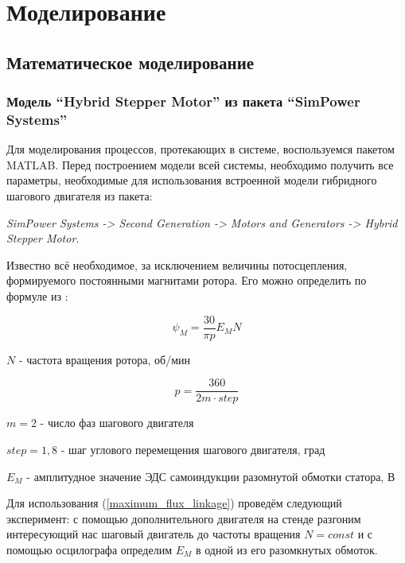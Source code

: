 \newpage
\section{Моделирование}

\subsection{Математическое моделирование}

\subsubsection{Модель ``Hybrid Stepper Motor'' из пакета ``SimPower Systems''}

Для моделирования процессов, протекающих в системе, воспользуемся пакетом MATLAB.
Перед построением модели всей системы, необходимо получить все параметры,
необходимые для использования встроенной модели гибридного шагового двигателя из пакета:

\textit{SimPower Systems -> Second Generation -> Motors and Generators -> Hybrid Stepper Motor.}

Известно всё необходимое, за исключением величины потосцепления, формируемого
постоянными магнитами ротора. Его можно определить по формуле
из \cite{Matlab_help_stepper_motor}:

\begin{equation}
    \label{maximum_flux_linkage}
    \psi_{M} = \frac{30}{\pi p} E_{M} N
\end{equation}

$N$ - частота вращения ротора, об/мин

$$
    p = \frac{360}{2m \cdot step}
$$

$m = 2$ - число фаз шагового двигателя

$step = 1,8$ - шаг углового перемещения шагового двигателя, град

$E_{M}$ - амплитудное значение ЭДС самоиндукции разомнутой обмотки статора, В

Для использования (\ref{maximum_flux_linkage}) проведём следующий эксперимент:
с помощью дополнительного двигателя на стенде разгоним интересующий нас шаговый
двигатель до частоты вращения $N = const$ и с помощью осцилографа определим $E_{M}$
в одной из его разомкнутых обмоток.

